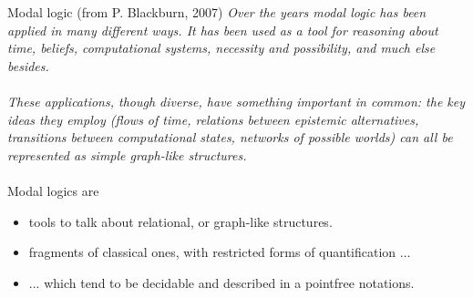 \documentclass[aspectratio=169]{beamer}
\begin{document}
\begin{slide}{Modal logic (from P. Blackburn, 2007)}\label{s:9}
\small
\emph{Over the years modal logic has been applied in many different ways. It has been used as a tool for reasoning about \alert{time, beliefs, computational systems, necessity} and \alert{possibility}, and much else besides. \\
~\\

These applications, though diverse, have something important in common: the key ideas they employ (flows of time, relations between epistemic alternatives, transitions between computational states, networks of possible worlds) can all be represented as \alert{simple graph-like structures}.  }
~\\
~\\

Modal logics are
\begin{itemize}
\item  \alert{tools to talk about relational, or graph-like structures}.
\item  \alert{fragments of classical ones}, with restricted forms of quantification ...
\item  ... which tend to be \alert{decidable} and described in a pointfree notations.
\end{itemize}
\end{slide}
\end{document}

